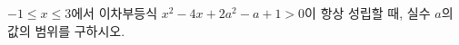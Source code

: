 \hspace*{2mm}\begin{minipage}[t]{\dimexpr\linewidth-2mm\relax}\vspace{0pt}
$-1\le x\le 3$에서 이차부등식 $x^2-4x+2a^2-a+1>0$이 항상 성립할 때, 실수 $a$의 값의 범위를 구하시오.\end{minipage}
